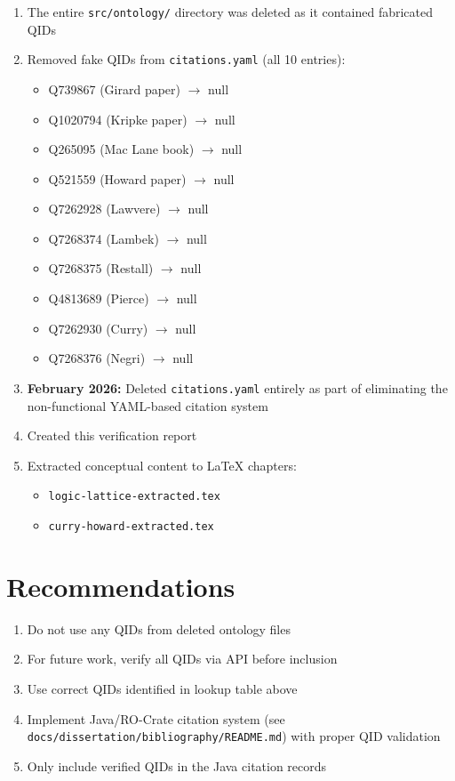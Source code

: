 \begin{enumerate}
    \item The entire \texttt{src/ontology/} directory was deleted as it contained fabricated QIDs
    \item Removed fake QIDs from \texttt{citations.yaml} (all 10 entries):
    \begin{itemize}
        \item Q739867 (Girard paper) $\to$ null
        \item Q1020794 (Kripke paper) $\to$ null
        \item Q265095 (Mac Lane book) $\to$ null
        \item Q521559 (Howard paper) $\to$ null
        \item Q7262928 (Lawvere) $\to$ null
        \item Q7268374 (Lambek) $\to$ null
        \item Q7268375 (Restall) $\to$ null
        \item Q4813689 (Pierce) $\to$ null
        \item Q7262930 (Curry) $\to$ null
        \item Q7268376 (Negri) $\to$ null
    \end{itemize}
    \item \textbf{February 2026:} Deleted \texttt{citations.yaml} entirely as part of eliminating the non-functional YAML-based citation system
    \item Created this verification report
    \item Extracted conceptual content to LaTeX chapters:
    \begin{itemize}
        \item \texttt{logic-lattice-extracted.tex}
        \item \texttt{curry-howard-extracted.tex}
    \end{itemize}
\end{enumerate}

\section*{Recommendations}

\begin{enumerate}
    \item Do not use any QIDs from deleted ontology files
    \item For future work, verify all QIDs via API before inclusion
    \item Use correct QIDs identified in lookup table above
    \item Implement Java/RO-Crate citation system (see \texttt{docs/dissertation/bibliography/README.md}) with proper QID validation
    \item Only include verified QIDs in the Java citation records
\end{enumerate}

